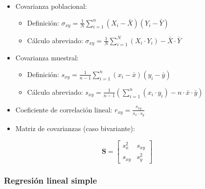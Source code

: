 \documentclass[
]{article}
\providecommand{\tightlist}{%
  \setlength{\itemsep}{0pt}\setlength{\parskip}{0pt}}
\begin{document}
\begin{itemize}
\item
  Covarianza poblacional:

  \begin{itemize}
  \tightlist
  \item
    Definición:
    \(\sigma_{xy} = \frac{1}{N} \sum\limits_{i=1}^n(X_i-\bar X)(Y_i-\bar Y)\)
  \item
    Cálculo abreviado:
    \(\sigma_{xy} = \frac{1}{N} \sum\limits_{i=1}^N(X_i \cdot Y_i) - \bar X \cdot \bar Y\)
  \end{itemize}
\item
  Covarianza muestral:

  \begin{itemize}
  \tightlist
  \item
    Definición:
    \(s_{xy} = \frac{1}{n-1} \sum\limits_{i=1}^n(x_i-\bar x)(y_i-\bar y)\)
  \item
    Cálculo abreviado:
    \(s_{xy} = \frac{1}{n-1} \left ( \sum\limits_{i=1}^n(x_i \cdot y_i) - n \cdot \bar x \cdot \bar y \right )\)
  \end{itemize}
\item
  Coeficiente de correlación lineal:
  \(r_{xy}=\frac{s_{xy}}{s_x \cdot s_y}\)
\item
  Matriz de covarianzas (caso bivariante):
\end{itemize}

\[\mathbf{S} = \left [\begin{array}{cc}
s^2_x & s_{xy}\\
s_{xy} & s_y^2
\end{array}\right ]\]

\hypertarget{regresiuxf3n-lineal-simple}{%
\subsubsection{Regresión lineal
simple}\label{regresiuxf3n-lineal-simple}}
\end{document}
